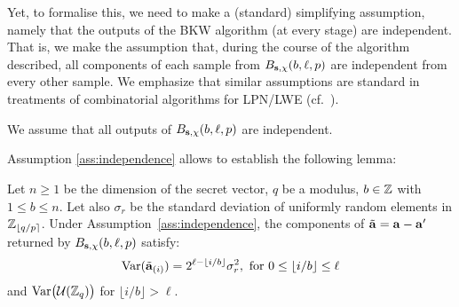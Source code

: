 Yet, to formalise this, we need to make a (standard) simplifying assumption, namely that the outputs of the BKW algorithm (at every stage) are independent. That is, we make the assumption that, during the course of the algorithm described, all components of each sample from $B_{\mathbf{s},\chi}(b,\ell,p)$ are independent from every other sample.
We emphasize that similar assumptions are standard in treatments of combinatorial algorithms for LPN/LWE (cf.\ \cite{albrecht-cid-faugere-fitzpatrick-perret:dcc2013,FL06}).
\begin{assumption}\label{ass:independence}
We assume that all outputs of $B_{\mathbf{s},\chi}(b,\ell,p)$ are independent.
\end{assumption}
Assumption \ref{ass:independence} allows to establish the following lemma:
\begin{lemma}
\label{lem:regrowth}
Let $n\ge 1$ be the dimension of the \LWE{} secret vector, $q$ be a modulus, $b \in \mathbb{Z}$ with $1 \leq b \le n$.   
Let also $\sigma_r$ be the standard deviation of uniformly random elements in $\mathbb{Z}_{\left\lfloor{q/p}\right\rceil}$. 
Under Assumption~\ref{ass:independence}, the components of $\tilde{\mathbf{a}} = \mathbf{a}- \mathbf{a}'$ returned by $B_{\mathbf{s},\chi}(b,\ell,p)$ satisfy:
$$
\textnormal{Var}(\tilde{\mathbf{a}}_{(i)}) = 2^{\ell - \lfloor i/b\rfloor} \sigma_r^2, \textnormal{ for } 0 \leq  \lfloor i/b \rfloor \leq \ell$$ and $\textnormal{Var}\big(\mathcal{U}(\mathbb{Z}_q)\big)$ for $\lfloor i/b\rfloor > \ell$.
\end{lemma}

